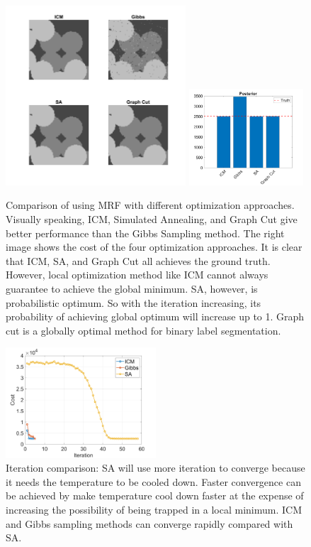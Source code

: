 \documentclass[a4paper]{article}
\begin{document}
	\begin{figure}[htbp]
	\centering
	\includegraphics[width=0.6\textwidth]{./figures/cmp1.png}
	\includegraphics[width=0.38\textwidth]{./figures/cmp2.png}
    \caption{Comparison of using MRF with different optimization approaches. Visually speaking, ICM, Simulated Annealing, and Graph Cut give better performance than the Gibbs Sampling method. The right image shows the cost of the four optimization approaches. It is clear that ICM, SA, and Graph Cut all achieves the ground truth. However, local optimization method like ICM cannot always guarantee to achieve the global minimum. SA, however, is probabilistic optimum. So with the iteration increasing, its probability of achieving global optimum will increase up to 1. Graph cut is a globally optimal method for binary label segmentation.}
\end{figure}

	\begin{figure}[htbp]
	\centering
	\includegraphics[width=0.5\textwidth]{./figures/cmp.png}
    \caption{Iteration comparison: SA will use more iteration to converge because it needs the temperature to be cooled down. Faster convergence can be achieved by make temperature cool down faster at the expense of increasing the possibility of being trapped in a local minimum. ICM and Gibbs sampling methods can converge rapidly compared with SA.}
\end{figure}
\end{document}
